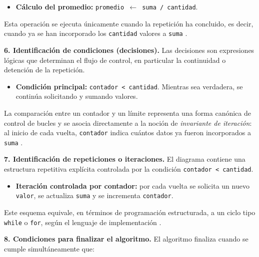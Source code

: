 \documentclass[12pt,twoside]{book}
\begin{document}
					\begin{itemize}
						\item \textbf{Cálculo del promedio:} \texttt{promedio $\leftarrow$ suma / cantidad}.
					\end{itemize}
					
					\noindent
					Esta operación se ejecuta únicamente cuando la repetición ha concluido, es decir, cuando ya se han incorporado los \texttt{cantidad} valores a \texttt{suma} \cite{Farrell2018Programming,Joyanes2007Fundamentos}.
					
					\noindent
					\textbf{6. Identificación de condiciones (decisiones).}
					Las decisiones son expresiones lógicas que determinan el flujo de control, en particular la continuidad o detención de la repetición.
					
					\begin{itemize}
						\item \textbf{Condición principal:} \texttt{contador < cantidad}. Mientras sea verdadera, se continúa solicitando y sumando valores.
					\end{itemize}
					
					\noindent
					La comparación entre un contador y un límite representa una forma canónica de control de bucles y se asocia directamente a la noción de \emph{invariante de iteración}: al inicio de cada vuelta, \texttt{contador} indica cuántos datos ya fueron incorporados a \texttt{suma} \cite{Cormen2022Introduction}.
					
					\noindent
					\textbf{7. Identificación de repeticiones o iteraciones.}
					El diagrama contiene una estructura repetitiva explícita controlada por la condición \texttt{contador < cantidad}.
					
					\begin{itemize}
						\item \textbf{Iteración controlada por contador:} por cada vuelta se solicita un nuevo \texttt{valor}, se actualiza \texttt{suma} y se incrementa \texttt{contador}.
					\end{itemize}
					
					\noindent
					Este esquema equivale, en términos de programación estructurada, a un ciclo tipo \texttt{while} o \texttt{for}, según el lenguaje de implementación \cite{Farrell2018Programming,Gaddis2022Starting}.
					
					\noindent
					\textbf{8. Condiciones para finalizar el algoritmo.}
					El algoritmo finaliza cuando se cumple simultáneamente que:
					
\end{document}
